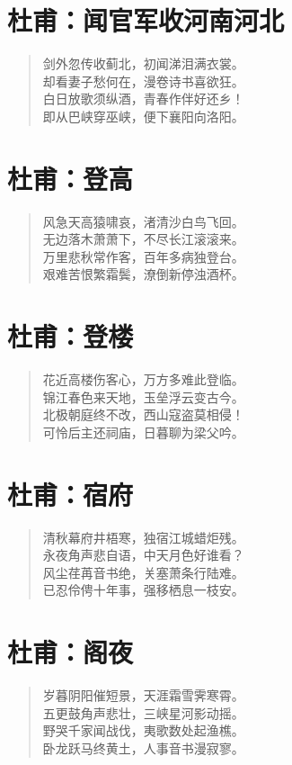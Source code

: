 \documentclass[12pt,oneside]{book}
\newenvironment{shici}{%
\begin{verse}\centering\yanti\large\hspace{12pt}}{\end{verse}}
\begin{document}
\begin{common-format}
\chapter{杜甫：闻官军收河南河北}
\begin{shici}
剑外忽传收蓟北，初闻涕泪满衣裳。\\
却看妻子愁何在，漫卷诗书喜欲狂。\\
白日放歌须纵酒，青春作伴好还乡！\\
即从巴峡穿巫峡，便下襄阳向洛阳。
\end{shici}

\chapter{杜甫：登高}
\begin{shici}
风急天高猿啸哀，渚清沙白鸟飞回。\\
无边落木萧萧下，不尽长江滚滚来。\\
万里悲秋常作客，百年多病独登台。\\
艰难苦恨繁霜鬓，潦倒新停浊酒杯。
\end{shici}

\chapter{杜甫：登楼}
\begin{shici}
花近高楼伤客心，万方多难此登临。\\
锦江春色来天地，玉垒浮云变古今。\\
北极朝庭终不改，西山寇盗莫相侵！\\
可怜后主还祠庙，日暮聊为梁父吟。
\end{shici}

\chapter{杜甫：宿府}
\begin{shici}
清秋幕府井梧寒，独宿江城蜡炬残。\\
永夜角声悲自语，中天月色好谁看？\\
风尘荏苒音书绝，关塞萧条行陆难。\\
已忍伶俜十年事，强移栖息一枝安。
\end{shici}

\chapter{杜甫：阁夜}
\begin{shici}
岁暮阴阳催短景，天涯霜雪霁寒霄。\\
五更鼓角声悲壮，三峡星河影动摇。\\
野哭千家闻战伐，夷歌数处起渔樵。\\
卧龙跃马终黄土，人事音书漫寂寥。
\end{shici}


\end{common-format}
\end{document}
